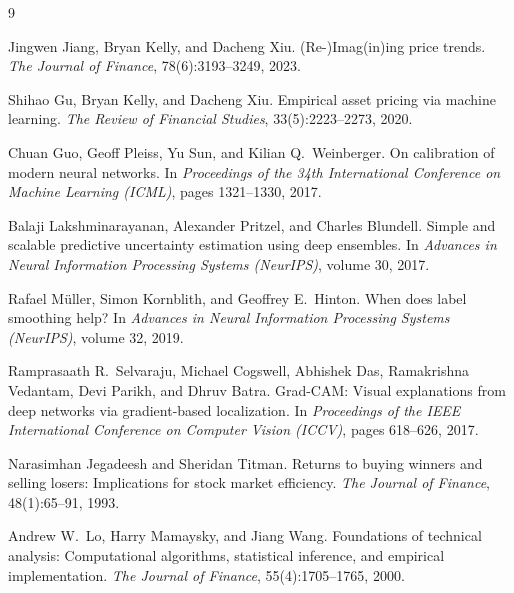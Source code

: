 \documentclass[10pt]{article}
\begin{document}
\begin{thebibliography}{9}
\footnotesize
\setlength{\itemsep}{0.5pt}

Jingwen Jiang, Bryan Kelly, and Dacheng Xiu.
\newblock (Re-)Imag(in)ing price trends.
\newblock \emph{The Journal of Finance}, 78(6):3193--3249, 2023.

Shihao Gu, Bryan Kelly, and Dacheng Xiu.
\newblock Empirical asset pricing via machine learning.
\newblock \emph{The Review of Financial Studies}, 33(5):2223--2273, 2020.

Chuan Guo, Geoff Pleiss, Yu Sun, and Kilian Q.\ Weinberger.
\newblock On calibration of modern neural networks.
\newblock In \emph{Proceedings of the 34th International Conference on Machine Learning (ICML)}, pages 1321--1330, 2017.

Balaji Lakshminarayanan, Alexander Pritzel, and Charles Blundell.
\newblock Simple and scalable predictive uncertainty estimation using deep ensembles.
\newblock In \emph{Advances in Neural Information Processing Systems (NeurIPS)}, volume 30, 2017.

Rafael M\"uller, Simon Kornblith, and Geoffrey E.\ Hinton.
\newblock When does label smoothing help?
\newblock In \emph{Advances in Neural Information Processing Systems (NeurIPS)}, volume 32, 2019.

Ramprasaath R.\ Selvaraju, Michael Cogswell, Abhishek Das, Ramakrishna Vedantam, Devi Parikh, and Dhruv Batra.
\newblock Grad-CAM: Visual explanations from deep networks via gradient-based localization.
\newblock In \emph{Proceedings of the IEEE International Conference on Computer Vision (ICCV)}, pages 618--626, 2017.

Narasimhan Jegadeesh and Sheridan Titman.
\newblock Returns to buying winners and selling losers: Implications for stock market efficiency.
\newblock \emph{The Journal of Finance}, 48(1):65--91, 1993.

Andrew W.\ Lo, Harry Mamaysky, and Jiang Wang.
\newblock Foundations of technical analysis: Computational algorithms, statistical inference, and empirical implementation.
\newblock \emph{The Journal of Finance}, 55(4):1705--1765, 2000.

\end{thebibliography}
\end{document}
